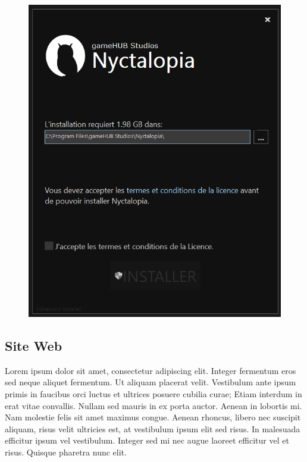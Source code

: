 \begin{figure}[H]
\centering
\begin{minipage}{.5\textwidth}
  \centering
  \centerline{\includegraphics[width=1.5\linewidth]{img/ui/installer.png}}
  \label{fig:uiinstaller}
\end{minipage}%
\end{figure}

\subsection{Site Web}
\setlength{\parindent}{5ex}
Lorem ipsum dolor sit amet, consectetur adipiscing elit. Integer fermentum eros sed neque aliquet fermentum. Ut aliquam placerat velit. Vestibulum ante ipsum primis in faucibus orci luctus et ultrices posuere cubilia curae; Etiam interdum in erat vitae convallis. Nullam sed mauris in ex porta auctor. Aenean in lobortis mi. Nam molestie felis sit amet maximus congue. Aenean rhoncus, libero nec suscipit aliquam, risus velit ultricies est, at vestibulum ipsum elit sed risus. In malesuada efficitur ipsum vel vestibulum. Integer sed mi nec augue laoreet efficitur vel et risus. Quisque pharetra nunc elit.

